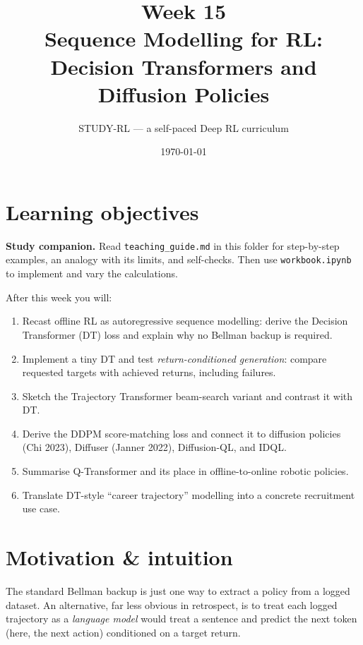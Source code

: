 \documentclass[11pt,oneside]{scrbook}
\title{{\color{rlblue}\textbf{Week 15} \\ \Huge Sequence Modelling for RL: Decision Transformers and Diffusion Policies}}
\author{STUDY-RL --- a self-paced Deep RL curriculum}
\date{\today}
\begin{document}
\maketitle
\tableofcontents
\newpage

\chapter*{Learning objectives}

\noindent\textbf{Study companion.} Read \texttt{teaching\_guide.md} in this
folder for step-by-step examples, an analogy with its limits, and self-checks.
Then use \texttt{workbook.ipynb} to implement and vary the calculations.
\par\medskip

\begin{keyidea}
After this week you will:
\begin{enumerate}
  \item Recast offline RL as autoregressive sequence modelling: derive the Decision Transformer (DT) loss and explain why no Bellman backup is required.
  \item Implement a tiny DT and test \emph{return-conditioned generation}: compare requested targets with achieved returns, including failures.
  \item Sketch the Trajectory Transformer beam-search variant and contrast it with DT.
  \item Derive the DDPM score-matching loss and connect it to diffusion policies (Chi 2023), Diffuser (Janner 2022), Diffusion-QL, and IDQL.
  \item Summarise Q-Transformer and its place in offline-to-online robotic policies.
  \item Translate DT-style ``career trajectory'' modelling into a concrete recruitment use case.
\end{enumerate}
\end{keyidea}

\chapter{Motivation \& intuition}

The standard Bellman backup is just one way to extract a policy from a logged dataset.  An alternative, far less obvious in retrospect, is to treat each logged trajectory as a \emph{language model} would treat a sentence and predict the next token (here, the next action) conditioned on a target return.
\end{document}
